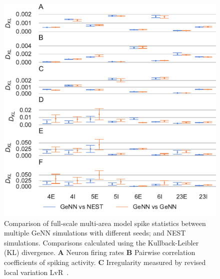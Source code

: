 \documentclass[9pt,a4paper]{amsart}
\begin{document}
%
\begin{figure}
    \centering
    \includegraphics{figures/microcircuit_accuracy_kl}
    \caption{Comparison of full-scale multi-area model spike statistics between multiple GeNN simulations with different seeds; and NEST simulations.
    Comparisons calculated using the Kullback-Leibler (KL) divergence.
    \textbf{A} Neuron firing rates
    \textbf{B} Pairwise correlation coefficients of spiking activity.
    \textbf{C} Irregularity measured by revised local variation LvR~\citep{Shinomoto2009}.}
    \label{fig:microcircuit_accuracy_kl}
\end{figure}
%
\end{document}
